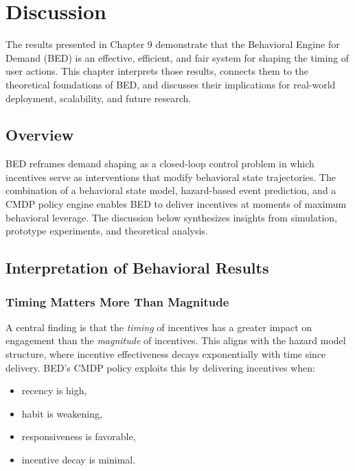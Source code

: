 \chapter{Discussion}

The results presented in Chapter 9 demonstrate that the Behavioral Engine for
Demand (BED) is an effective, efficient, and fair system for shaping the timing
of user actions. This chapter interprets those results, connects them to the
theoretical foundations of BED, and discusses their implications for real-world
deployment, scalability, and future research.

\section{Overview}

BED reframes demand shaping as a closed-loop control problem in which incentives
serve as interventions that modify behavioral state trajectories. The
combination of a behavioral state model, hazard-based event prediction, and a
CMDP policy engine enables BED to deliver incentives at moments of maximum
behavioral leverage. The discussion below synthesizes insights from simulation,
prototype experiments, and theoretical analysis.

\section{Interpretation of Behavioral Results}

\subsection{Timing Matters More Than Magnitude}

A central finding is that the \emph{timing} of incentives has a greater impact
on engagement than the \emph{magnitude} of incentives. This aligns with the
hazard model structure, where incentive effectiveness decays exponentially with
time since delivery. BED’s CMDP policy exploits this by delivering incentives
when:

\begin{itemize}
    \item recency is high,
    \item habit is weakening,
    \item responsiveness is favorable,
    \item incentive decay is minimal.
\end{itemize}

